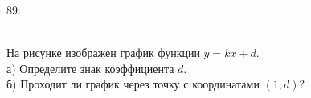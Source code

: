 89. \begin{figure}[ht!]
\end{figure}\\
На рисунке изображен график функции $y=kx+d.$\\
а) Определите знак коэффициента $d.$\\
б) Проходит ли график через точку с координатами $(1; d) ?$\\
